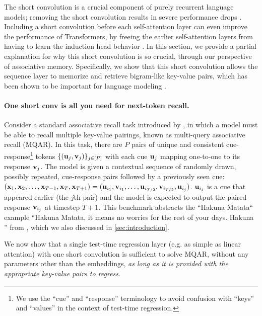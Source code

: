 \documentclass[notitlepage, 11pt]{article}
\begin{document}
The short convolution is a crucial component of purely recurrent language models; removing the short convolution results in severe performance drops \citep{Yang2024GatedLinearAttention,Yang2024ParallelizingLinearTransformers,Yang2024GatedDeltaNetworks,Sun2024LearningLearnTest}.
Including a short convolution before each self-attention layer can even improve the performance of Transformers, by freeing the earlier self-attention layers from having to learn the induction head behavior \citep{Xu2024KVShiftingAttention}.
In this section, we provide a partial explanation for why this short convolution is so crucial, through our perspective of associative memory.
Specifically, we show that this short convolution allows the sequence layer to memorize and retrieve bigram-like key-value pairs, which has been shown to be important for language modeling \citep{Arora2023ZoologyMeasuringImproving}.

\paragraph{One short conv is all you need for next-token recall.}
Consider a standard associative recall task introduced by \citet{Arora2023ZoologyMeasuringImproving}, in which a model must be able to recall multiple key-value pairings, known as multi-query associative recall (MQAR).
In this task, there are $P$ pairs of unique and consistent cue-response\footnote{We use the ``cue'' and ``response'' terminology to avoid confusion with ``keys'' and ``values'' in the context of test-time regression.} tokens $\{(\mathbf{u}_j, \mathbf{v}_j)\}_{j\in [P]}$ with each cue $\mathbf{u}_j$ mapping one-to-one to its response $\mathbf{v}_j$.
The model is given a contextual sequence of randomly drawn, possibly repeated, cue-response pairs followed by a previously seen cue: $(\mathbf{x}_1, \mathbf{x}_2, \ldots, \mathbf{x}_{T-1}, \mathbf{x}_T, \mathbf{x}_{T+1}) = (\mathbf{u}_{i_1}, \mathbf{v}_{i_1}, \ldots, \mathbf{u}_{i_{T/2}}, \mathbf{v}_{i_{T/2}}, \mathbf{u}_{i_j})$. $\mathbf{u}_{i_j}$ is a cue that appeared earlier (the $j$th pair) and the model is expected to output the paired response $\mathbf{v}_{i_j}$ at timestep $T+1$.
This benchmark abstracts the ``Hakuna Matata`` example ``Hakuna Matata, it means no worries for the rest of your days. Hakuna \underline{\hspace{1cm}} '' from \citet{Arora2023ZoologyMeasuringImproving}, which we also discussed in \autoref{sec:introduction}.

We now show that a single test-time regression layer (e.g. as simple as linear attention) with one short convolution is sufficient to solve MQAR, without any parameters other than the embeddings, \emph{as long as it is provided with the appropriate key-value pairs to regress}.
\end{document}
